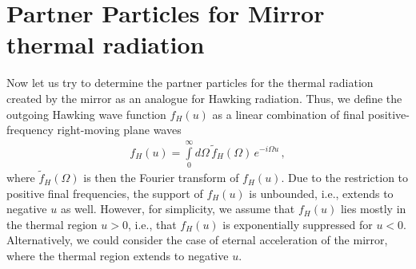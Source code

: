 \documentclass[aps,prd,showpacs,amssymb,nofootinbib,twocolumn]{revtex4}
\newcommand{\bea}{\begin{eqnarray}}
\newcommand{\ea}{\end{eqnarray}}
\begin{document}
\section{Partner Particles for Mirror thermal radiation}

Now let us try to determine the partner particles for the thermal 
radiation created by the mirror as an analogue for Hawking radiation. 
%
Thus, we define the outgoing Hawking wave function $f_H(u)$ as a linear 
combination of final positive-frequency right-moving plane waves 
%
\bea
\label{Hawking-mode}
f_H(u)=\int\limits_0^\infty d\Omega\,\tilde f_H(\Omega)\, e^{-i\Omega u}
\,,
\ea
%
where $\tilde f_H(\Omega)$ is then the Fourier transform of $f_H(u)$.
%
Due to the restriction to positive final frequencies, the support of $f_H(u)$ 
is unbounded, i.e., extends to negative $u$ as well. 
%
However, for simplicity, we assume that $f_H(u)$ lies mostly in the thermal 
region $u>0$, i.e., that $f_H(u)$ is exponentially suppressed for $u<0$. 
%
Alternatively, we could consider the case of eternal acceleration of the 
mirror, where the thermal region extends to negative $u$. 
\end{document}
